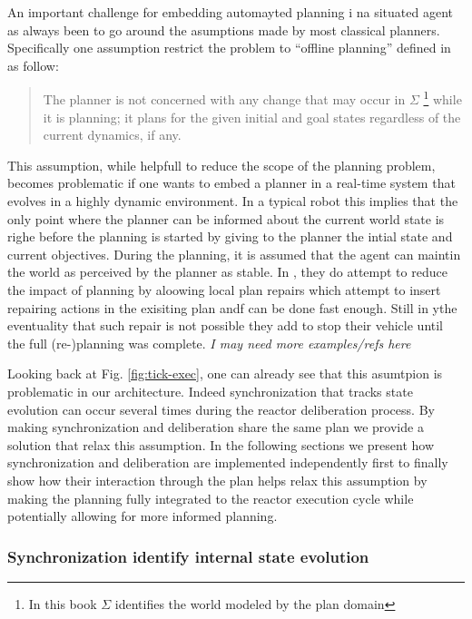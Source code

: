 An important challenge for embedding automayted planning i na situated
agent as always been to go around the asumptions made by most classical
planners. Specifically one assumption restrict the problem to ``offline
planning''  defined in \cite{ghallab04} as follow:

\begin{quotation}
  The planner is not concerned with any change that may occur in
  $\Sigma$ \footnote{In this book $\Sigma$ identifies the world modeled
    by the plan domain} while it is planning; it plans for the given
  initial and goal states regardless of the current dynamics, if any.
\end{quotation}

This assumption, while helpfull to reduce the scope of the planning
problem, becomes problematic if one wants to embed a planner in a
real-time system that evolves in a highly dynamic environment. In a
typical robot this implies that the only point where the planner can
be informed about the current world state is righe before the planning
is started by giving to the planner the intial state and current
objectives. During the planning, it is assumed that the agent can
maintin the world as perceived by the planner as stable. In
\cite{lemai04, lemai-chenevier2004}, they do attempt to reduce the
impact of planning by aloowing local plan repairs which attempt to
insert repairing actions in the exisiting plan andf can be done fast
enough. Still in ythe eventuality that such repair is not possible
they add to stop their vehicle until the full (re-)planning was
complete. {\em I may need more examples/refs here}

Looking back at Fig. \ref{fig:tick-exec}, one can already see that
this asumtpion is problematic in our architecture. Indeed
synchronization that tracks state evolution can occur several times
during the reactor deliberation process. By making synchronization and
deliberation share the same plan we provide a solution that relax this
assumption. In the following sections we present how synchronization
and deliberation are implemented independently first to finally show
how their interaction through the plan helps relax this assumption by
making the planning fully integrated to the reactor execution cycle
while potentially allowing for more informed planning.

\subsubsection{Synchronization identify internal state evolution}
\label{sec:arch:synch}

